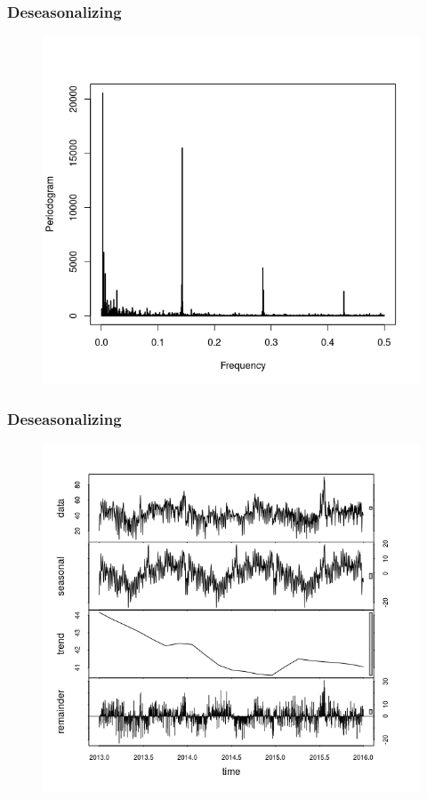 \documentclass{beamer}
\begin{document}
\begin{frame}
\frametitle{Deseasonalizing}

\begin{figure}
\includegraphics[width=0.7\linewidth]{periodogram.png}
\end{figure}

\end{frame}

\begin{frame}
\frametitle{Deseasonalizing}

\begin{figure}
\includegraphics[width=0.7\linewidth]{stl_plot.png}
\end{figure}

\end{frame}
\end{document}
